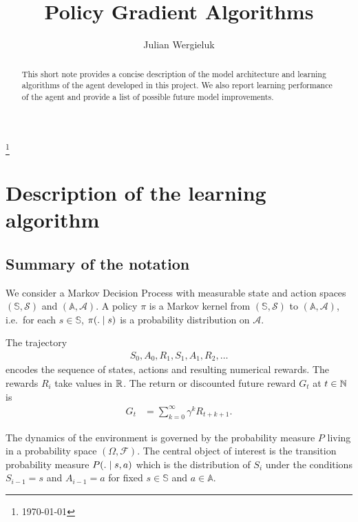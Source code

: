 \documentclass[a4paper,12pt]{amsart}
\title{Policy Gradient Algorithms}
\author{Julian Wergieluk}\address{}\email{julian.wergieluk@risklab.com}
\newcommand{\stateSpace}{\mathbb S}
\newcommand{\stateSpaceAlg}{\mathcal S}
\newcommand{\actionSpace}{\mathbb A}
\newcommand{\actionSpaceAlg}{\mathcal A}
\newcommand{\policy}{\pi}
\newcommand{\discountFactor}{\gamma}
\begin{document}
\maketitle

\begin{abstract}
This short note provides a concise description of the model architecture and
learning algorithms of the agent developed in this project. We also report learning
performance of the agent and provide a list of possible future model improvements.
\end{abstract}
\renewcommand*{\thefootnote}{}\footnote{\today{}}

\section{Description of the learning algorithm}


\subsection{Summary of the notation}

We consider a Markov Decision Process with measurable state and action spaces
$(\stateSpace, \stateSpaceAlg)$ and $(\actionSpace, \actionSpaceAlg)$.
A policy $\policy$ is a Markov kernel from $(\stateSpace, \stateSpaceAlg)$ to
$(\actionSpace, \actionSpaceAlg)$, i.e.\ for each $s\in\stateSpace$, 
$\policy(. \vb s)$ is a probability distribution on $\actionSpaceAlg$.

The trajectory
\begin{align*}
    S_0, A_0, R_1, S_1, A_1, R_2, \ldots
\end{align*}
encodes the sequence of states, actions and resulting numerical rewards. The
rewards $R_i$ take values in $\mathbb{R}$. 
The return or discounted future reward $G_t$ at $t\in\mathbb{N}$ is 
\begin{align*}
    G_t &= \sum_{k=0}^{\infty} \discountFactor^{k} R_{t+k+1}.
\end{align*}

The dynamics of the environment is governed by the probability measure $P$
living in a probability space $(\Omega, \mathcal F)$. 
The central object of interest is the transition probability measure
$P(. \;|\; s, a)$ which is the distribution of $S_i$ under the conditions
$S_{i-1} = s$ and $A_{i-1} = a$ for fixed $s\in\stateSpace$ and $a\in\actionSpace$.
\end{document}
